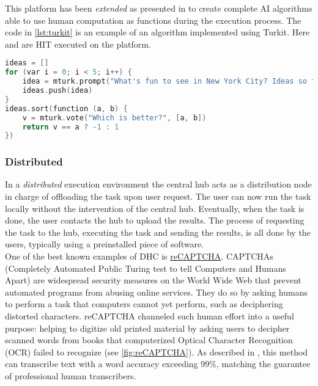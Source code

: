 This platform has been \emph{extended} as presented in \cite{little2010turkit}
to create complete \acl{AI} algorithms able to use human computation as functions
during the execution process. The code in \autoref{lst:turkit} is an example of an
algorithm implemented using Turkit. Here  and 
are \acl{HIT} executed on the  platform.
\begin{lstlisting}[language=C++,caption={Example of a Turkit algorithm.},
label={lst:turkit}]
ideas = []
for (var i = 0; i < 5; i++) {
	idea = mturk.prompt("What's fun to see in New York City? Ideas so far: " + ideas.join(", "))
	ideas.push(idea)
}
ideas.sort(function (a, b) {
	v = mturk.vote("Which is better?", [a, b])
	return v == a ? -1 : 1
})
\end{lstlisting}







\subsubsection{Distributed}
In a \emph{distributed} execution environment the central hub acts as a distribution
node in charge of offloading the task upon user request. The user can now run the
task locally without the intervention of the central hub. Eventually, when the task
is done, the user contacts the hub to upload the results.
The process of requesting the task to the hub, executing the task and sending the
results, is all done by the users, typically using a preinstalled piece of software.\\

One of the best known examples of \ac{DHC} is
\href{http://www.google.com/recaptcha}{reCAPTCHA}.
CAPTCHAs (Completely Automated Public Turing test to tell Computers and Humans
Apart) are widespread security measures on the World Wide Web that prevent
automated programs from abusing online services. They do so by asking humans to
perform a task that computers cannot yet perform, such as deciphering distorted
characters. reCAPTCHA channeled such human effort into a useful purpose: helping to
digitize old printed material by asking users to decipher scanned words from books
that computerized Optical Character Recognition (OCR) failed to recognize (see
\autoref{fig:reCAPTCHA}).
As described in \cite{von2008recaptcha}, this method can transcribe text with a
word accuracy exceeding 99\%, matching the guarantee of professional human
transcribers.

